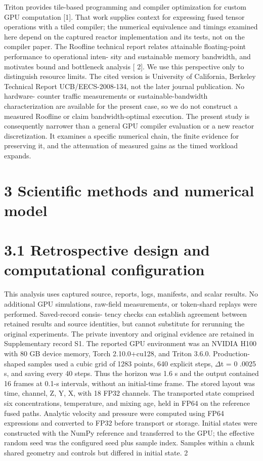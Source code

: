 \documentclass[11pt]{article}
\begin{document}
Triton provides tile-based programming and compiler optimization for custom GPU computation
[1]. That work supplies context for expressing fused tensor operations with a tiled compiler; the
numerical equivalence and timings examined here depend on the captured reactor implementation
and its tests, not on the compiler paper.
The Roofline technical report relates attainable floating-point performance to operational inten-
sity and sustainable memory bandwidth, and motivates bound and bottleneck analysis [ 2]. We use
this perspective only to distinguish resource limits. The cited version is University of California,
Berkeley Technical Report UCB/EECS-2008-134, not the later journal publication. No hardware-
counter traffic measurements or sustainable-bandwidth characterization are available for the present
case, so we do not construct a measured Roofline or claim bandwidth-optimal execution.
The present study is consequently narrower than a general GPU compiler evaluation or a new
reactor discretization. It examines a specific numerical chain, the finite evidence for preserving it,
and the attenuation of measured gains as the timed workload expands.

\section*{3 Scientific methods and numerical model}


\section*{3.1 Retrospective design and computational configuration}

This analysis uses captured source, reports, logs, manifests, and scalar results. No additional GPU
simulations, raw-field measurements, or token-shard replays were performed. Saved-record consis-
tency checks can establish agreement between retained results and source identities, but cannot
substitute for rerunning the original experiments. The private inventory and original evidence are
retained in Supplementary record S1.
The reported GPU environment was an NVIDIA H100 with 80 GB device memory, Torch
2.10.0+cu128, and Triton 3.6.0. Production-shaped samples used a cubic grid of 1283 points,
640 explicit steps, \ensuremath{\Delta}t = 0 .0025 s, and saving every 40 steps. Thus the horizon was 1.6 s and the
output contained 16 frames at 0.1-s intervals, without an initial-time frame. The stored layout was
time, channel, Z, Y, X, with 18 FP32 channels. The transported state comprised six concentrations,
temperature, and mixing age, held in FP64 on the reference fused paths. Analytic velocity and
pressure were computed using FP64 expressions and converted to FP32 before transport or storage.
Initial states were constructed with the NumPy reference and transferred to the GPU; the effective
random seed was the configured seed plus sample index. Samples within a chunk shared geometry
and controls but differed in initial state.
2
\end{document}
